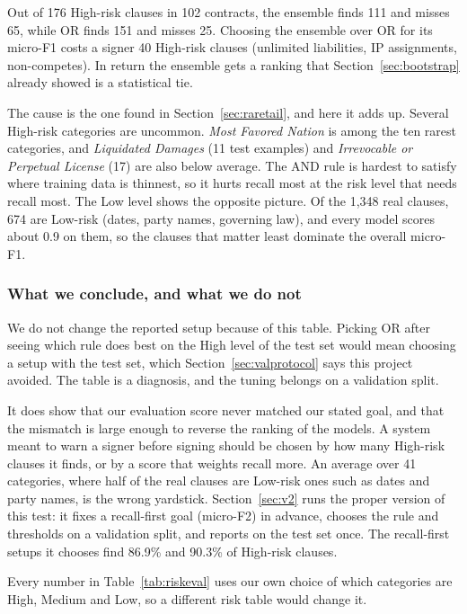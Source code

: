 Out of 176 High-risk clauses in 102 contracts, the ensemble finds 111 and misses 65, while OR finds 151 and misses 25. Choosing the ensemble over OR for its micro-F1 costs a signer 40 High-risk clauses (unlimited liabilities, IP assignments, non-competes). In return the ensemble gets a ranking that Section~\ref{sec:bootstrap} already showed is a statistical tie.

The cause is the one found in Section~\ref{sec:raretail}, and here it adds up. Several High-risk categories are uncommon. \emph{Most Favored Nation} is among the ten rarest categories, and \emph{Liquidated Damages} (11 test examples) and \emph{Irrevocable or Perpetual License} (17) are also below average. The AND rule is hardest to satisfy where training data is thinnest, so it hurts recall most at the risk level that needs recall most. The Low level shows the opposite picture. Of the 1{,}348 real clauses, 674 are Low-risk (dates, party names, governing law), and every model scores about 0.9 on them, so the clauses that matter least dominate the overall micro-F1.

\subsubsection{What we conclude, and what we do not}
We do not change the reported setup because of this table. Picking OR after seeing which rule does best on the High level of the test set would mean choosing a setup with the test set, which Section~\ref{sec:valprotocol} says this project avoided. The table is a diagnosis, and the tuning belongs on a validation split.

It does show that our evaluation score never matched our stated goal, and that the mismatch is large enough to reverse the ranking of the models. A system meant to warn a signer before signing should be chosen by how many High-risk clauses it finds, or by a score that weights recall more. An average over 41 categories, where half of the real clauses are Low-risk ones such as dates and party names, is the wrong yardstick. Section~\ref{sec:v2} runs the proper version of this test: it fixes a recall-first goal (micro-F2) in advance, chooses the rule and thresholds on a validation split, and reports on the test set once. The recall-first setups it chooses find 86.9\% and 90.3\% of High-risk clauses.

Every number in Table~\ref{tab:riskeval} uses our own choice of which categories are High, Medium and Low, so a different risk table would change it.
